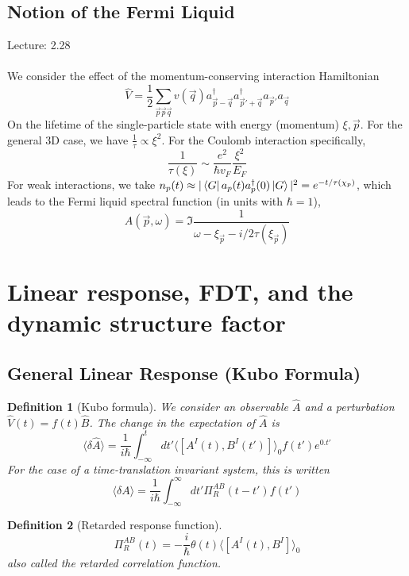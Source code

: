 \documentclass[10pt]{article}
\newtheorem*{defn}{Definition}
\newcommand{\Lec}[1]{Lecture: #1 \\ \\ \noindent}
\begin{document}
\subsection{Notion of the Fermi Liquid}
\Lec{2.28}
We consider the effect of the momentum-conserving interaction Hamiltonian
$$
\hat V = \frac{1}{2}\sum_{\vec p \vec p \vec q}v(\vec q) a_{\vec p - \vec q}^\dagger a^\dagger_{\vec p' + \vec q}a_{\vec p'}a_{\vec q}
$$
On the lifetime of the single-particle state with energy (momentum) $\xi, \vec p$. For the general 3D case, we have $\frac{1}{\tau} \propto \xi^2$. For the Coulomb interaction specifically,
$$
\frac{1}{\tau(\xi)} \sim \frac{e^2}{\hbar v_F}\frac{\xi^2}{E_F}
$$
For weak interactions, we take $n_p(t) \approx |\bra{G} a_p(t)a_p^\dagger(0) \ket{G}|^2 = e^{-t/\tau(\chi_p)}$, which leads to the Fermi liquid spectral function (in units with $\hbar = 1$),
$$
A(\vec p , \omega) = \Im \frac{1}{\omega-\xi_{\vec p} - i/2\tau(\xi_{\vec p})}
$$

\section{Linear response, FDT, and the dynamic structure factor}
\subsection{General Linear Response (Kubo Formula)}
\begin{defn}[Kubo formula]
We consider an observable $\hat A$ and a perturbation $\hat V(t) = f(t)\hat B$. The change in the expectation of $\hat A$ is
$$
\langle \delta \hat A \rangle = \frac{1}{i\hbar} \int_{-\infty}^t dt' \langle [A^I(t), B^I(t')]\rangle_0f(t')e^{0.t'}
$$
For the case of a time-translation invariant system, this is written
$$
\langle \delta A \rangle  = \frac{1}{i\hbar}\int_{-\infty}^\infty dt' \Pi^{AB}_R(t-t')f(t')
$$
\end{defn}
\begin{defn}[Retarded response function]
$$
\Pi^{AB}_R(t) =-\frac{i}{\hbar} \theta(t)\langle [A^I(t), B^I]\rangle_0
$$
also called the retarded correlation function.
\end{defn}
\end{document}
